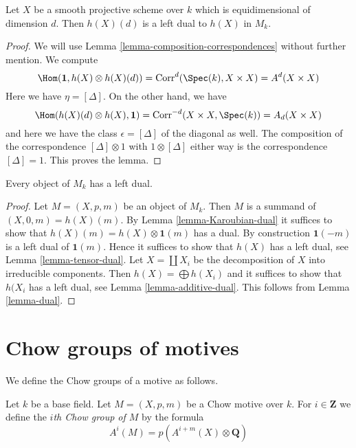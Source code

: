 \begin{lemma}
\label{lemma-dual}
Let $X$ be a smooth projective scheme over $k$ which is equidimensional
of dimension $d$. Then $h(X)(d)$ is a left dual to $h(X)$ in $M_k$.
\end{lemma}

\begin{proof}
We will use Lemma \ref{lemma-composition-correspondences}
without further mention. We compute
$$
\Hom(\mathbf{1}, h(X) \otimes h(X)(d)) =
\text{Corr}^d(\Spec(k), X \times X) = A^d(X \times X)
$$
Here we have $\eta = [\Delta]$. On the other hand, we have
$$
\Hom(h(X)(d) \otimes h(X), \mathbf{1}) =
\text{Corr}^{-d}(X \times X, \Spec(k)) = A_d(X \times X)
$$
and here we have the class $\epsilon = [\Delta]$
of the diagonal as well. The composition of the correspondence
$[\Delta] \otimes 1$ with $1 \otimes [\Delta]$ either way
is the correspondence $[\Delta] = 1$. This proves the lemma.
\end{proof}

\begin{lemma}
\label{lemma-dual-general}
Every object of $M_k$ has a left dual.
\end{lemma}

\begin{proof}
Let $M = (X, p, m)$ be an object of $M_k$. Then $M$ is a summand of
$(X, 0, m) = h(X)(m)$.
By Lemma \ref{lemma-Karoubian-dual} it suffices to show that
$h(X)(m) = h(X) \otimes \mathbf{1}(m)$ has a dual.
By construction $\mathbf{1}(-m)$ is a left dual of $\mathbf{1}(m)$.
Hence it suffices to show that $h(X)$ has a left dual, see
Lemma \ref{lemma-tensor-dual}.
Let $X = \coprod X_i$ be the decomposition of $X$ into
irreducible components. Then $h(X) = \bigoplus h(X_i)$
and it suffices to show that $h(X_i$ has a left dual, see
Lemma \ref{lemma-additive-dual}.
This follows from Lemma \ref{lemma-dual}.
\end{proof}






\section{Chow groups of motives}
\label{section-chow-groups-motives}

\noindent
We define the Chow groups of a motive as follows.

\begin{definition}
\label{definition-chow-group-motives}
Let $k$ be a base field. Let $M = (X, p, m)$ be a Chow motive over $k$.
For $i \in \mathbf{Z}$ we define the {\it $i$th Chow group of $M$}
by the formula
$$
A^i(M) = p\left(A^{i + m}(X) \otimes \mathbf{Q}\right)
$$
\end{definition}

